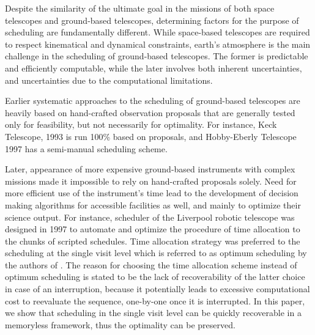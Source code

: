 \documentclass[12pt,aas_macros]{article}
\theoremstyle{definition}
\begin{document}
Despite the similarity of the ultimate goal in the missions of both space telescopes and ground-based telescopes, determining factors for the purpose of scheduling are fundamentally different. While space-based telescopes are required to respect kinematical and dynamical constraints, earth's atmosphere is the main challenge in the scheduling of ground-based telescopes. The former is predictable and efficiently computable, while the later involves both inherent uncertainties, and uncertainties due to the computational limitations. 

Earlier systematic approaches to the scheduling of ground-based telescopes are heavily based on hand-crafted observation proposals that are generally tested only for feasibility, but not necessarily for optimality. For instance,  Keck Telescope, 1993 \cite{nelson1985design} is run 100\% based on proposals, and Hobby-Eberly Telescope 1997 \cite{shetrone2007ten} has a semi-manual scheduling scheme. 

Later, appearance of more expensive ground-based instruments with complex missions made it impossible to rely on hand-crafted proposals solely. Need for more efficient use of the instrument's time lead to the development of decision making algorithms for accessible facilities as well, and mainly to optimize their science output. For instance, scheduler of the Liverpool robotic telescope was designed in 1997 to automate and optimize the procedure of time allocation to the chunks of scripted schedules. Time allocation strategy was preferred to the scheduling at the single visit level which is referred to as optimum scheduling by the authors of \cite{steele1997control}. The reason for choosing the time allocation scheme instead of optimum scheduling is stated to be the lack of recoverability of the latter choice in case of an interruption, because it potentially leads to excessive computational cost to reevaluate the sequence, one-by-one once it is interrupted. In this paper, we show that scheduling in the single visit level can be quickly recoverable in a memoryless framework, thus the optimality can be preserved.
\end{document}
